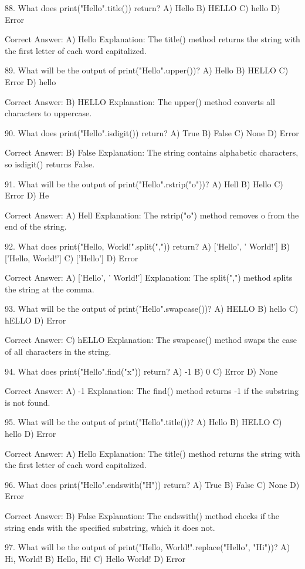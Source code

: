 88. What does print("Hello".title()) return?
A) Hello
B) HELLO
C) hello
D) Error

Correct Answer: A) Hello
Explanation: The title() method returns the string with the first letter of each word capitalized.

89. What will be the output of print("Hello".upper())?
A) Hello
B) HELLO
C) Error
D) hello

Correct Answer: B) HELLO
Explanation: The upper() method converts all characters to uppercase.

90. What does print("Hello".isdigit()) return?
A) True
B) False
C) None
D) Error

Correct Answer: B) False
Explanation: The string contains alphabetic characters, so isdigit() returns False.

91. What will be the output of print("Hello".rstrip("o"))?
A) Hell
B) Hello
C) Error
D) He

Correct Answer: A) Hell
Explanation: The rstrip("o") method removes o from the end of the string.

92. What does print("Hello, World!".split(",")) return?
A) ['Hello', ' World!']
B) ['Hello, World!']
C) ['Hello']
D) Error

Correct Answer: A) ['Hello', ' World!']
Explanation: The split(",") method splits the string at the comma.

93. What will be the output of print("Hello".swapcase())?
A) HELLO
B) hello
C) hELLO
D) Error

Correct Answer: C) hELLO
Explanation: The swapcase() method swaps the case of all characters in the string.

94. What does print("Hello".find("x")) return?
A) -1
B) 0
C) Error
D) None

Correct Answer: A) -1
Explanation: The find() method returns -1 if the substring is not found.

95. What will be the output of print("Hello".title())?
A) Hello
B) HELLO
C) hello
D) Error

Correct Answer: A) Hello
Explanation: The title() method returns the string with the first letter of each word capitalized.

96. What does print("Hello".endswith("H")) return?
A) True
B) False
C) None
D) Error

Correct Answer: B) False
Explanation: The endswith() method checks if the string ends with the specified substring, which it does not.

97. What will be the output of print("Hello, World!".replace("Hello", "Hi"))?
A) Hi, World!
B) Hello, Hi!
C) Hello World!
D) Error

